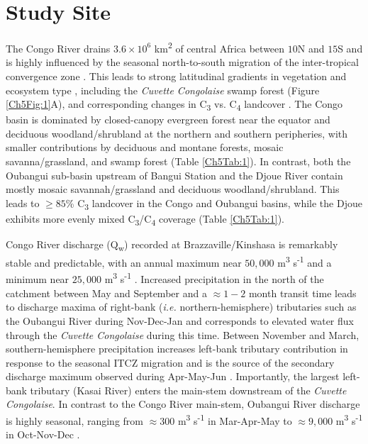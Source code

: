 \section{Study Site}

The Congo River drains $3.6 \times 10^6$ km\textsuperscript{2} of central Africa between $10$\textdegree N and $15$\textdegree S and is highly influenced by the seasonal north-to-south migration of the inter-tropical convergence zone \citep[ITCZ;][]{Gasse:2000ul}. This leads to strong latitudinal gradients in vegetation and ecosystem type \citep{Mayaux:2004uw}, including the \textit{Cuvette Congolaise} swamp forest (Figure \ref{Ch5Fig:1}A), and corresponding changes in C\textsubscript{3} vs. C\textsubscript{4} landcover \citep[Figure \ref{Ch5Fig:1}B;][]{Still:2010wh}. The Congo basin is dominated by closed-canopy evergreen forest near the equator and deciduous woodland/shrubland at the northern and southern peripheries, with smaller contributions by deciduous and montane forests, mosaic savanna/grassland, and swamp forest (Table \ref{Ch5Tab:1}). In contrast, both the Oubangui sub-basin upstream of Bangui Station and the Djoue River contain mostly mosaic savannah/grassland and deciduous woodland/shrubland. This leads to $\geq 85$\% C\textsubscript{3} landcover in the Congo and Oubangui basins, while the Djoue exhibits more evenly mixed C\textsubscript{3}/C\textsubscript{4} coverage (Table \ref{Ch5Tab:1}).

Congo River discharge (Q\textsubscript{w}) recorded at Brazzaville/Kinshasa is remarkably stable and predictable, with an annual maximum near $50,000$ m\textsuperscript{3} s\textsuperscript{-1} and a minimum near $25,000$ m\textsuperscript{3} s\textsuperscript{-1} \citep[Figure \ref{Ch5Fig:2}A;][]{Coynel:2005cn,Laraque:2009fz,Spencer:2014vp}. Increased precipitation in the north of the catchment between May and September \citep{Mahe:1993wu} and a $\approx 1 - 2$ month transit time \citep{Bricquet:1993ve} leads to discharge maxima of right-bank (\textit{i.e.} northern-hemisphere) tributaries such as the Oubangui River during Nov-Dec-Jan \citep{Coynel:2005cn,Bouillon:2012cw,Bouillon:2014ko} and corresponds to elevated water flux through the \textit{Cuvette Congolaise} during this time. Between November and March, southern-hemisphere precipitation increases left-bank tributary contribution in response to the seasonal ITCZ migration and is the source of the secondary discharge maximum observed during Apr-May-Jun \citep[Figure \ref{Ch5Fig:2}A;][]{Bricquet:1993ve,Mahe:1993wu}. Importantly, the largest left-bank tributary (Kasai River) enters the main-stem downstream of the \textit{Cuvette Congolaise}. In contrast to the Congo River main-stem, Oubangui River discharge is highly seasonal, ranging from $\approx 300$ m\textsuperscript{3} s\textsuperscript{-1} in Mar-Apr-May to $\approx 9,000$ m\textsuperscript{3} s\textsuperscript{-1} in Oct-Nov-Dec \citep{Bouillon:2012cw,Bouillon:2014ko}.

